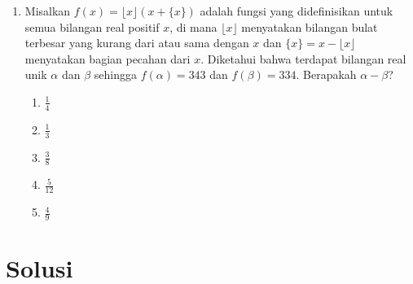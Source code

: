 \documentclass{article}
\begin{document}
\begin{enumerate}
\item Misalkan $f(x)=\lfloor x\rfloor(x+\{x\})$ adalah fungsi yang didefinisikan untuk semua bilangan real positif $x$, di mana $\lfloor x\rfloor$ menyatakan bilangan bulat terbesar yang kurang dari atau sama dengan $x$ dan $\{x\}=x-\lfloor x\rfloor$ menyatakan bagian pecahan dari $x$. Diketahui bahwa terdapat bilangan real unik $\alpha$ dan $\beta$ sehingga $f(\alpha)=343$ dan $f(\beta)=334$. Berapakah $\alpha-\beta$?
\begin{enumerate}
    \item $\frac{1}{4}$
    \item $\frac{1}{3}$
    \item $\frac{3}{8}$
    \item $\frac{5}{12}$
    \item $\frac{4}{9}$
\end{enumerate}

\end{enumerate}

\section*{Solusi}
\end{document}
